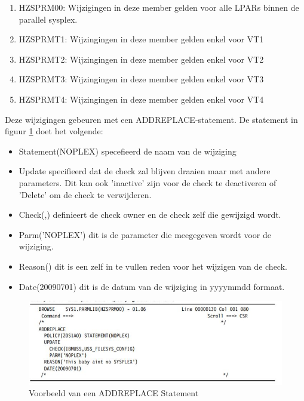 \begin{enumerate}
	\item HZSPRM00: Wijzigingen in deze member gelden voor alle LPARs binnen de parallel sysplex.
	\item HZSPRMT1: Wijzingingen in deze member gelden enkel voor VT1
	\item HZSPRMT2: Wijzingingen in deze member gelden enkel voor VT2
	\item HZSPRMT3: Wijzingingen in deze member gelden enkel voor VT3
	\item HZSPRMT4: Wijzingingen in deze member gelden enkel voor VT4
\end{enumerate}

Deze wijzigingen gebeuren met een ADDREPLACE-statement. De statement in figuur \ref{fig:addreplace} doet het volgende:

\begin{itemize}
	\item Statement(NOPLEX) specefieerd de naam van de wijziging
	\item Update specifieerd dat de check zal blijven draaien maar met andere parameters. Dit kan ook 'inactive' zijn voor de check te deactiveren of 'Delete' om de check te verwijderen.
	\item Check(,) definieert de check owner en de check zelf die gewijzigd wordt.
	\item Parm('NOPLEX') dit is de parameter die meegegeven wordt voor de wijziging.
	\item Reason() dit is een zelf in te vullen reden voor het wijzigen van de check.
	\item Date(20090701) dit is de datum van de wijziging in yyyymmdd formaat. \cite{Bezzi2010}
\end{itemize}

\begin{figure}[h]
	\centering
	\includegraphics{img/addreplace}
	\caption[ADDREPLACE statement]{Voorbeeld van een ADDREPLACE Statement}
	\label{fig:addreplace}
\end{figure}


